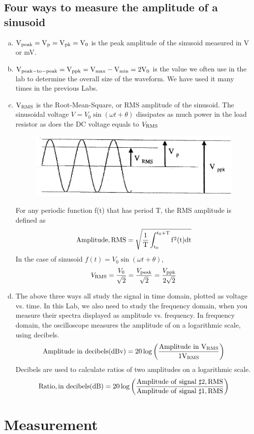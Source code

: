 \documentclass[a4paper]{report}
\begin{document}
\subsection{Four ways to measure the amplitude of a sinusoid}
\begin{enumerate}[a)]
	\item $\rm V_{peak}=V_p=V_{pk}=V_0$ is the peak amplitude of the sinusoid measured in V or mV.
	\item $\rm V_{peak-to-peak}=V_{ppk}=V_{max}-V_{min}=2V_0$ is the value we often use in the lab to determine the overall size of the waveform. We have used it many times in the previous Labs.
	\item $\rm V_{RMS}$ is the Root-Mean-Square, or RMS amplitude of the sinusoid. The sinusoidal voltage $V=V_0\sin(\omega t+\theta)$ dissipates as much power in the load resistor as does the DC voltage equals to $V_{\rm{RMS}}$
	\begin{figure}[H]
		\centering
		\includegraphics[width=1\linewidth]{7.jpg}
	\end{figure}
    For any periodic function f(t) that has period T, the RMS amplitude is defined as
    $$\rm{Amplitude,RMS}=\sqrt{\frac{1}{T}\int_{t_0}^{t_0+T}f^2(t)dt}$$
    In the case of sinusoid $f(t)=V_0\sin(\omega t+\theta)$,
    $$V_{\rm{RMS}}=\frac{V_0}{\sqrt{2}}=\frac{V_{\rm{peak}}}{\sqrt{2}}=\frac{V_{\rm{ppk}}}{2\sqrt{2}}$$
	\item The above three ways all study the signal in time domain, plotted as voltage vs. time. In this Lab, we also need to study the frequency domain, when you measure their spectra displayed as amplitude vs. frequency. In frequency domain, the oscilloscope measures the amplitude of on a logarithmic scale, using decibels.
    $$\rm Amplitude\ in\ decibels(dBv)=20\log\left(\frac{Amplitude\ in\ V_{RMS}}{1V_{RMS}}\right)$$
    Decibels are used to calculate ratios of two amplitudes on a logarithmic scale.
    $$\rm Ratio,in\ decibels(dB)=20\log\left(\frac{Amplitude\ of\ signal\ \sharp 2,RMS}{Amplitude\ of\ signal\ \sharp 1,RMS}\right)$$
\end{enumerate}
\section{Measurement}
\end{document}
